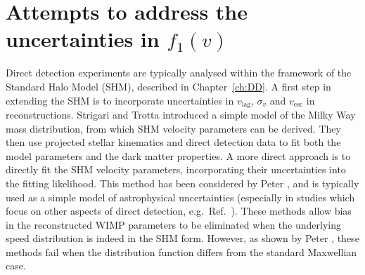 

\section{Attempts to address the uncertainties in $f_1(v)$}
\label{sec:Speed:attempts}

Direct detection experiments are typically analysed within the framework of the Standard Halo Model (SHM), described in Chapter~\ref{ch:DD}. A first step in extending the SHM is to incorporate uncertainties in $v_\textrm{lag}$, $\sigma_v$ and $v_\textrm{esc}$ in reconstructions. Strigari and Trotta \cite{Strigari:2009} introduced a simple model of the Milky Way mass distribution, from which SHM velocity parameters can be derived. They then use projected stellar kinematics and direct detection data to fit both the model parameters and the dark matter properties. A more direct approach is to directly fit the SHM velocity parameters, incorporating their uncertainties into the fitting likelihood. This method has been considered by Peter \cite{Peter:2010}, and is typically used as a simple model of astrophysical uncertainties (especially in studies which focus on other aspects of direct detection, e.g.\ Ref.~\cite{Arina:2013}). These methods allow bias in the reconstructed WIMP parameters to be eliminated when the underlying speed distribution is indeed in the SHM form. However, as shown by Peter \cite{Peter:2011}, these methods fail when the distribution function differs from the standard Maxwellian case.

